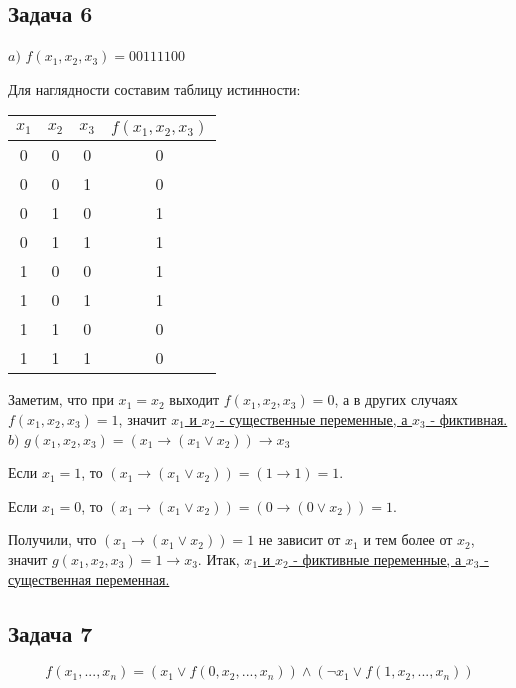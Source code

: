 \documentclass[a4paper,12pt]{article} %
\begin{document}
\begin{center}
\item \section*{Задача 6}
\end{center}

$a)$ $f(x_1,x_2,x_3)=00111100$

Для наглядности составим  таблицу истинности:
\begin{center}
\begin{tabular}{|c|c|c|c|}
\hline
$x_1$ & $x_2$ & $x_3$ & $f(x_1,x_2,x_3)$ \\
\hline
0 & 0 & 0 & 0 \\
\hline
0 & 0 & 1 & 0 \\
\hline
0 & 1 & 0 & 1 \\
\hline
0 & 1 & 1 & 1 \\
\hline
1 & 0 & 0 & 1 \\
\hline
1 & 0 & 1 & 1 \\
\hline
1 & 1 & 0 & 0 \\
\hline
1 & 1 & 1 & 0 \\
\hline
\end{tabular}
\end{center}

Заметим, что при $x_1=x_2$ выходит $f(x_1,x_2,x_3)=0$, а в других случаях $f(x_1,x_2,x_3)=1$, значит \underline{$x_1$ и $x_2$ - существенные переменные, а $x_3$ - фиктивная.} \\

$b)$ $g(x_1,x_2,x_3)=(x_1\rightarrow (x_1\vee x_2))\rightarrow x_3$

Если $x_1=1$, то $(x_1\rightarrow (x_1\vee x_2))=(1\rightarrow 1)=1$.

Если $x_1=0$, то $(x_1\rightarrow (x_1\vee x_2))=(0\rightarrow (0\vee x_2))=1$.

Получили, что $(x_1\rightarrow (x_1\vee x_2))=1$ не зависит от $x_1$ и тем более от $x_2$, значит $g(x_1,x_2,x_3)=1\rightarrow x_3$.
Итак, \underline{$x_1$ и $x_2$ - фиктивные переменные, а $x_3$ - существенная переменная.}

\newpage
\begin{center}
\section*{Задача 7}
\end{center}
\[f(x_1,...,x_n)=(x_1\vee f(0,x_2,...,x_n))\wedge (\neg x_1 \vee f(1,x_2,...,x_n))\]
\end{document}
